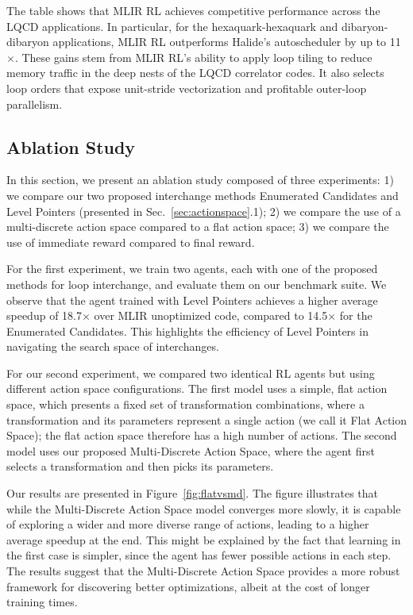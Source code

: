 \documentclass[10pt,twocolumn]{article}
\begin{document}
The table shows that MLIR RL achieves competitive performance across the LQCD applications. In particular, for the hexaquark-hexaquark and dibaryon-dibaryon applications, MLIR RL outperforms Halide's autoscheduler by up to 11$\times$. These gains stem from MLIR RL's ability to apply loop tiling to reduce memory traffic in the deep nests of the LQCD correlator codes. It also selects loop orders that expose unit-stride vectorization and profitable outer-loop parallelism.

\subsection{Ablation Study}

In this section, we present an ablation study composed of three experiments: 1) we compare our two proposed interchange methods Enumerated Candidates and Level Pointers (presented in Sec.~\ref{sec:actionspace}.1); 2) we compare the use of a multi-discrete action space compared to a flat action space; 3) we compare the use of immediate reward compared to final reward.

For the first experiment, we train two agents, each with one of the proposed methods for loop interchange, and evaluate them on our benchmark suite. We observe that the agent trained with Level Pointers achieves a higher average speedup of 18.7$\times$ over MLIR unoptimized code, compared to 14.5$\times$ for the Enumerated Candidates. This highlights the efficiency of Level Pointers in navigating the search space of interchanges.

For our second experiment, we compared two identical RL agents but using different action space configurations. The first model uses a simple, flat action space, which presents a fixed set of transformation combinations, where a transformation and its parameters represent a single action (we call it Flat Action Space); the flat action space therefore has a high number of actions. The second model uses our proposed Multi-Discrete Action Space, where the agent first selects a transformation and then picks its parameters.

Our results are presented in Figure~\ref{fig:flatvsmd}. The figure illustrates that while the Multi-Discrete Action Space model converges more slowly, it is capable of exploring a wider and more diverse range of actions, leading to a higher average speedup at the end. This might be explained by the fact that learning in the first case is simpler, since the agent has fewer possible actions in each step. The results suggest that the Multi-Discrete Action Space provides a more robust framework for discovering better optimizations, albeit at the cost of longer training times.
\end{document}
